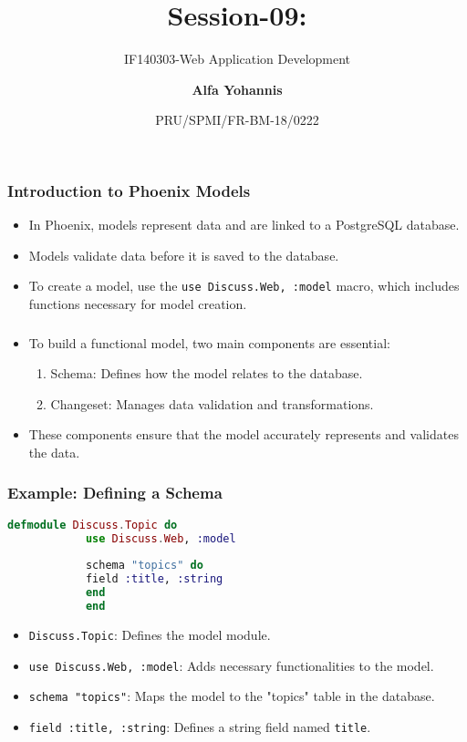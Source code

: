 \documentclass[aspectratio=169, table]{beamer}
\subtitle{IF140303-Web Application Development}
\title{\LARGE{Session-09:\\ \shortstack{Creating Forms and\\Routing in Phoenix}}
	\vspace{20pt}}
\date[Serial]{\scriptsize {PRU/SPMI/FR-BM-18/0222}}
\author[Pradita]{\small{\textbf{Alfa Yohannis}}}
\begin{document}
	
	\frame{\titlepage}
	\begin{frame}
		\frametitle{Introduction to Phoenix Models}
		\begin{itemize}
			\item In Phoenix, models represent data and are linked to a PostgreSQL database.
			\item Models validate data before it is saved to the database.
			\item To create a model, use the \texttt{use Discuss.Web, :model} macro, which includes functions necessary for model creation.
		\end{itemize}
	\end{frame}
	
	\begin{frame}
		\frametitle{}
		\begin{itemize}
			\item To build a functional model, two main components are essential:
			\begin{enumerate}
				\item Schema: Defines how the model relates to the database.
				\item Changeset: Manages data validation and transformations.
			\end{enumerate}
			\item These components ensure that the model accurately represents and validates the data.
		\end{itemize}
	\end{frame}
	
	\begin{frame}[fragile]
		\frametitle{Example: Defining a Schema}
		\begin{lstlisting}[language=Elixir]
			defmodule Discuss.Topic do
			use Discuss.Web, :model
			
			schema "topics" do
			field :title, :string
			end
			end
		\end{lstlisting}
		\begin{itemize}
			\item \texttt{Discuss.Topic}: Defines the model module.
			\item \texttt{use Discuss.Web, :model}: Adds necessary functionalities to the model.
			\item \texttt{schema "topics"}: Maps the model to the "topics" table in the database.
			\item \texttt{field :title, :string}: Defines a string field named \texttt{title}.
		\end{itemize}
	\end{frame}
	
\end{document}

